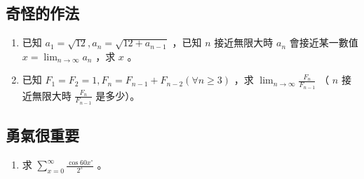 \documentclass[12pt]{article}
\begin{document}
\pagebreak

\subsection{奇怪的作法}

\begin{enumerate}
	\item 已知 $a_1 = \sqrt{12}, a_n = \sqrt{12 + a_{n-1}}$ ，已知 $n$ 接近無限大時 $a_n$ 會接近某一數值 $x = \lim _ {n \rightarrow \infty} a_n$ ，求 $x$ 。
		\vspace{30mm}
	\item 已知 $F_1 = F_2 = 1, F_n = F_{n-1} + F_{n-2} (\forall n \ge 3)$ ，求 $\lim _ {n \rightarrow \infty} \frac{F_n}{F_{n-1}}$ （ $n$ 接近無限大時 $\frac{F_n}{F_{n-1}}$ 是多少）。
		\vspace{30mm}
\end{enumerate}

\subsection{勇氣很重要}

\begin{enumerate}
	\item 求 $\sum _ {x = 0} ^ {\infty} \frac{\cos 60x ^ \circ}{2^x}$ 。
		\vspace{10mm}
\end{enumerate}
\end{document}
